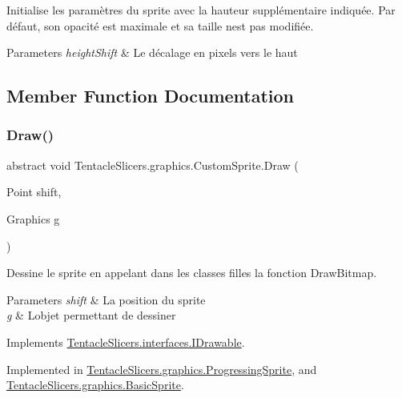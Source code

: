 Initialise les paramètres du sprite avec la hauteur supplémentaire indiquée. Par défaut, son opacité est maximale et sa taille n\textquotesingle{}est pas modifiée. 


\begin{DoxyParams}{Parameters}
{\em height\+Shift} & Le décalage en pixels vers le haut \\
\hline
\end{DoxyParams}


\subsection{Member Function Documentation}
\mbox{\label{class_tentacle_slicers_1_1graphics_1_1_custom_sprite_a2a673911c8438b95e4f1f50f06ccaa41}} 
\subsubsection{\texorpdfstring{Draw()}{Draw()}}
{\footnotesize\ttfamily abstract void Tentacle\+Slicers.\+graphics.\+Custom\+Sprite.\+Draw (\begin{DoxyParamCaption}\item[{Point}]{shift,  }\item[{Graphics}]{g }\end{DoxyParamCaption})\hspace{0.3cm}{\ttfamily [pure virtual]}}



Dessine le sprite en appelant dans les classes filles la fonction Draw\+Bitmap. 


\begin{DoxyParams}{Parameters}
{\em shift} & La position du sprite \\
\hline
{\em g} & L\textquotesingle{}objet permettant de dessiner \\
\hline
\end{DoxyParams}


Implements \hyperlink{interface_tentacle_slicers_1_1interfaces_1_1_i_drawable}{Tentacle\+Slicers.\+interfaces.\+I\+Drawable}.



Implemented in \hyperlink{class_tentacle_slicers_1_1graphics_1_1_progressing_sprite_acee169ba719f33614174a7f5e245192d}{Tentacle\+Slicers.\+graphics.\+Progressing\+Sprite}, and \hyperlink{class_tentacle_slicers_1_1graphics_1_1_basic_sprite_aca1918e67a22a98d4953d74f4e90a2f7}{Tentacle\+Slicers.\+graphics.\+Basic\+Sprite}.

